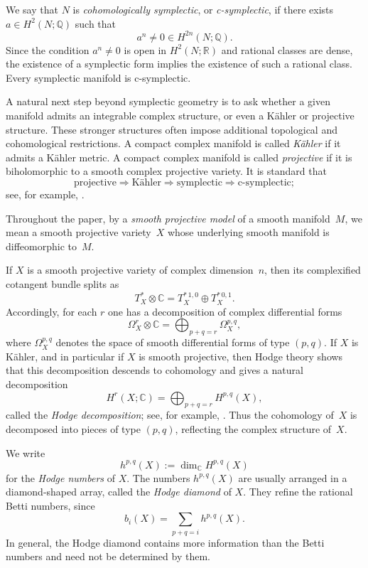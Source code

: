 \documentclass{amsart}
\numberwithin{equation}{section}
\theoremstyle{definition}
\theoremstyle{remark}
\newcommand{\C}{\mathbb C}
\newcommand{\R}{\mathbb R}
\newcommand{\Q}{\mathbb Q}
\begin{document}
We say that $N$ is \emph{cohomologically symplectic}, or \emph{c-symplectic}, if there exists $a\in H^2(N;\Q)$ such that
$$
    a^n\neq 0 \in H^{2n}(N;\Q).
$$
Since the condition $a^n \neq 0$ is open in $H^2(N;\R)$ and rational classes are dense, the existence of a symplectic form implies the existence of such a rational class.
Every symplectic manifold is c-symplectic.

A natural next step beyond symplectic geometry is to ask whether a given manifold admits an integrable complex structure, or even a K\"ahler or projective structure.
These stronger structures often impose additional topological and cohomological restrictions.
A compact complex manifold is called \emph{K\"ahler} if it admits a K\"ahler metric.
A compact complex manifold is called \emph{projective} if it is biholomorphic to a smooth complex projective variety.
It is standard that
$$
    \text{projective} \Longrightarrow \text{K\"ahler} \Longrightarrow \text{symplectic} \Longrightarrow \text{c-symplectic};
$$
see, for example, \cite{Huybrechts2005book}.

Throughout the paper, by a \emph{smooth projective model} of a smooth manifold~$M$, we mean a smooth projective variety~$X$ whose underlying smooth manifold is diffeomorphic to~$M$.

If $X$ is a smooth projective variety of complex dimension~$n$, then its complexified cotangent bundle splits as
$$
    T_X^\ast\otimes \C = T_X^{\ast\,1,0}\oplus T_X^{\ast\,0,1}.
$$
Accordingly, for each $r$ one has a decomposition of complex differential forms
$$
    \Omega_X^r\otimes \C=\bigoplus_{p+q=r}\Omega_X^{p,q},
$$
where $\Omega_X^{p,q}$ denotes the space of smooth differential forms of type $(p,q)$.
If $X$ is K\"ahler, and in particular if $X$ is smooth projective, then Hodge theory shows that this decomposition descends to cohomology and gives a natural decomposition
$$
    H^r(X;\C)=\bigoplus_{p+q=r} H^{p,q}(X),
$$
called the \emph{Hodge decomposition}; see, for example, \cite{Voisin2007book}.
Thus the cohomology of~$X$ is decomposed into pieces of type $(p,q)$, reflecting the complex structure of~$X$.

We write
$$
    h^{p,q}(X):=\dim_\C H^{p,q}(X)
$$
for the \emph{Hodge numbers} of $X$.
The numbers $h^{p,q}(X)$ are usually arranged in a diamond-shaped array, called the \emph{Hodge diamond} of $X$.
They refine the rational Betti numbers, since
$$
    b_i(X)=\sum_{p+q=i} h^{p,q}(X).
$$
In general, the Hodge diamond contains more information than the Betti numbers and need not be determined by them.
\end{document}

